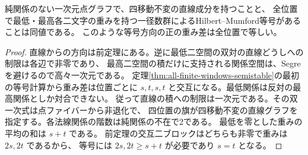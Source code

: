 \begin{corollary}\label{cor:curve-two-by-two-equality}
純関係のない一次元点グラフで、四移動不変の直線成分を持つことと、
全位置で最低・最高各二文字の重みを持つ一径数群によるHilbert--Mumford等号があることは同値である。
このような等号方向の正の重み差は全位置で等しい。
\end{corollary}
\begin{proof}
直線からの方向は前定理にある。逆に最低二空間の双対の直線どうしへの制限は各辺で非零であり、
最高二空間の積だけに支持される関係空間は、Segreを避けるので高々一次元である。
定理\ref{thm:all-finite-windows-semistable}の最初の等号計算から重み差は位置ごとに
$s,t,s,t$ と交互になる。最低関係は反対の最高関係としか対合できない。
従って直線の積への制限は一次元である。その双一次式は点ファイバーから非退化で、
四位置の旗が四移動不変の直線グラフを指定する。各法線関係の階数は純関係の不在で2である。
最低を零とした重みの平均の和は $s+t$ である。
前定理の交互二ブロックはどちらも非零で重みは $2s,2t$ であるから、
等号には $2s,2t\ge s+t$ が必要であり $s=t$ となる。
\end{proof}
